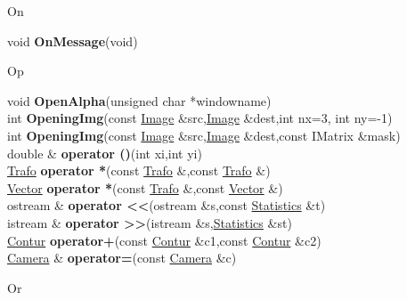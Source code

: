 \documentclass[10pt,titlepage]{article}
\def\functionlistentry#1#2#3#4#5#6{\noindent #1 {\bf #2}(#3) \dotfill #6\\}
\def\letterref#1{}
\def\letterlabel#1{\vspace{0.5cm}\centerline{\Large #1}}
\def\letterlabelend#1{}
\begin{document}
{{\letterlabel{On}
\letterref{A}
\letterref{B}
\letterref{C}
\letterref{D}
\letterref{E}
\letterref{F}
\letterref{G}
\letterref{H}
\letterref{I}
\letterref{K}
\letterref{L}
\letterref{M}
\letterref{N}
\letterref{O}
\letterref{P}
\letterref{Q}
\letterref{R}
\letterref{S}
\letterref{T}
\letterref{U}
\letterref{V}
\letterref{W}
\letterref{X}
\letterref{Y}
\letterref{Z}

\letterref{Of}
\letterref{On}
\letterref{Op}
\letterref{Or}
\letterlabelend{On}
\functionlistentry{void}{OnMessage}{void}{1548}{errorHandling}{}

\letterlabel{Op}
\letterref{A}
\letterref{B}
\letterref{C}
\letterref{D}
\letterref{E}
\letterref{F}
\letterref{G}
\letterref{H}
\letterref{I}
\letterref{K}
\letterref{L}
\letterref{M}
\letterref{N}
\letterref{O}
\letterref{P}
\letterref{Q}
\letterref{R}
\letterref{S}
\letterref{T}
\letterref{U}
\letterref{V}
\letterref{W}
\letterref{X}
\letterref{Y}
\letterref{Z}

\letterref{Of}
\letterref{On}
\letterref{Op}
\letterref{Or}
\letterlabelend{Op}
\functionlistentry{void}{OpenAlpha}{unsigned char *windowname}{1416}{genericTools}{}
\functionlistentry{int}{OpeningImg}{const \hyperlink{Image}{Image} \&src,\hyperlink{Image}{Image} \&dest,int nx=3, int ny=-1}{379}{filter}{}
\functionlistentry{int}{OpeningImg}{const \hyperlink{Image}{Image} \&src,\hyperlink{Image}{Image} \&dest,const IMatrix \&mask}{380}{filter}{}
\functionlistentry{double \&}{operator ()}{int xi,int yi}{811}{moments}{}
\functionlistentry{\hyperlink{Trafo}{Trafo}}{operator *}{const \hyperlink{Trafo}{Trafo} \&,const \hyperlink{Trafo}{Trafo} \&}{687}{geoTrafo}{}
\functionlistentry{\hyperlink{Vector}{Vector}}{operator *}{const \hyperlink{Trafo}{Trafo} \&,const \hyperlink{Vector}{Vector} \&}{688}{geoTrafo}{}
\functionlistentry{ostream \&}{operator <<}{ostream \&s,const \hyperlink{Statistics}{Statistics} \&t}{874}{statistics}{}
\functionlistentry{istream \&}{operator >>}{istream \&s,\hyperlink{Statistics}{Statistics} \&st}{875}{statistics}{}
\functionlistentry{\hyperlink{Contur}{Contur}}{operator+}{const \hyperlink{Contur}{Contur} \&c1,const \hyperlink{Contur}{Contur} \&c2}{404}{conturs}{}
\functionlistentry{\hyperlink{Camera}{Camera} \&}{operator=}{const \hyperlink{Camera}{Camera} \&c}{773}{cameraModel}{}

\letterlabel{Or}
\letterref{A}
\letterref{B}
\letterref{C}
\letterref{D}
\letterref{E}
\letterref{F}
\letterref{G}
\letterref{H}
\letterref{I}
\letterref{K}
\letterref{L}
\letterref{M}
\letterref{N}
\letterref{O}
\letterref{P}
\letterref{Q}
\letterref{R}
\letterref{S}
\letterref{T}
\letterref{U}
\letterref{V}
\letterref{W}
\letterref{X}
\letterref{Y}
\letterref{Z}

}}
\end{document}
